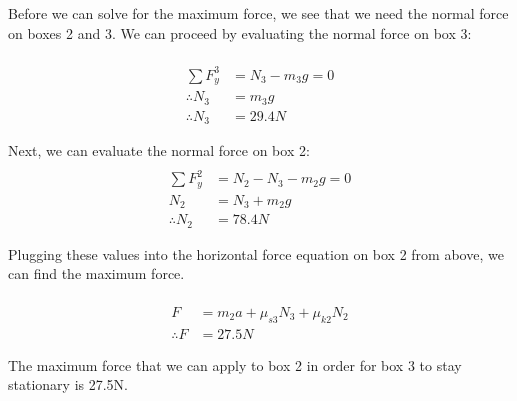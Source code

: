 Before we can solve for the maximum force, we see that we need the normal force on boxes 2 and 3. We can proceed by evaluating the normal force on box 3:

\begin{align*}
\\ \sum F_y^{3}&=N_3-m_3g=0
\\ \therefore N_3&=m_3g
\\ \therefore N_3&=29.4N
\end{align*}

Next, we can evaluate the normal force on box 2: 
\begin{align*}
\\ \sum F_y^{2}&=N_2-N_3-m_2g=0
\\ N_2&=N_3+m_2g
\\ \therefore N_2&=78.4N
\end{align*}

Plugging these values into the horizontal force equation on box 2 from above, we can find the maximum force.

\begin{align*}
\\ F&=m_2a+\mu_{s3}N_3+\mu_{k2}N_2
\\ \therefore F&=27.5N
\end{align*}

The maximum force that we can apply to box 2 in order for box 3 to stay stationary is 27.5N.
